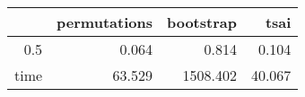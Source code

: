 \begin{table}[ht]
\centering
\begingroup\tiny
\begin{tabular}{rrrr}
  \hline
 & permutations & bootstrap & tsai \\ 
  \hline
0.5 & 0.064 & 0.814 & 0.104 \\ 
  time & 63.529 & 1508.402 & 40.067 \\ 
   \hline
\end{tabular}
\endgroup
\end{table}
